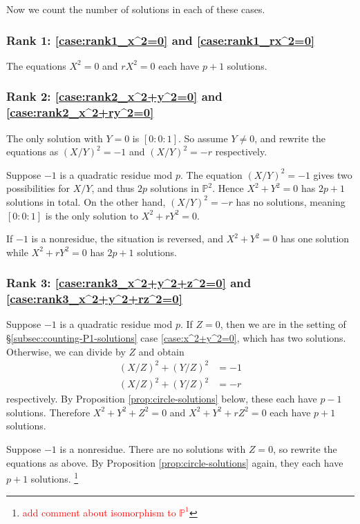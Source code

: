 \documentclass[10pt,a4paper]{amsart}
\numberwithin{equation}{section}
\numberwithin{figure}{section}
\theoremstyle{definition}
\theoremstyle{remark}
\theoremstyle{plain}
\theoremstyle{plain}
\theoremstyle{definition}
\theoremstyle{plain}
\theoremstyle{plain}
\renewcommand{\P}{\mathbb{P}}
\begin{document}
	Now we count the number of solutions in each of these cases.
	
	\subsubsection*{Rank 1: \eqref{case:rank1_x^2=0} and \eqref{case:rank1_rx^2=0}} 
	The equations $X^2 = 0$ and $rX^2 = 0$ each have $p + 1$ solutions.
	
	\subsubsection*{Rank 2: \eqref{case:rank2_x^2+y^2=0} and \eqref{case:rank2_x^2+ry^2=0}} 
	The only solution with $Y=0$ is $[0:0:1]$. So assume $Y \neq 0$, and rewrite the 
	equations as $(X/Y)^2 = -1$ and $(X/Y)^2 = -r$ respectively.
	
	Suppose $-1$ is a quadratic residue mod $p$. The equation $(X/Y)^2 = -1$ gives
	two possibilities for $X/Y$, and thus $2p$ solutions in $\mathbb{P}^2$. Hence
	$X^2 + Y^2 = 0$ has $2p + 1$ solutions in total. On the other hand, $(X/Y)^2 =
	-r$ has no solutions, meaning $[0:0:1]$ is the only solution to $X^2 + rY^2 =
	0$.
	
	If $-1$ is a nonresidue, the situation is reversed, and $X^2 + Y^2 = 0$ has one
	solution while $X^2 + rY^2 = 0$ has $2p + 1$ solutions.
	
	\subsubsection*{Rank 3: \eqref{case:rank3_x^2+y^2+z^2=0} and \eqref{case:rank3_x^2+y^2+rz^2=0}} 
	Suppose $-1$ is a quadratic residue mod $p$. If $Z = 0$, then we are in the setting of
	\S\ref{subsec:counting-P1-solutions} case \eqref{case:x^2+y^2=0}, which has two
	solutions. Otherwise, we can divide by $Z$ and obtain 
	\begin{align*} 
	(X/Z)^2 + (Y/Z)^2 &= -1 \\ 
	(X/Z)^2 + (Y/Z)^2 &= -r 
	\end{align*} 
	respectively. By Proposition \ref{prop:circle-solutions} below, these each have $p - 1$
	solutions. Therefore $X^2 + Y^2 + Z^2 = 0$ and $X^2 + Y^2 + rZ^2 = 0$ each have
	$p+1$ solutions.
	
	Suppose $-1$ is a nonresidue. There are no solutions with $Z=0$, so rewrite the
	equations as above. By Proposition \ref{prop:circle-solutions} again, they each
	have $p + 1$ solutions. \footnote{\textcolor{red}{add comment about isomorphism
			to $\P^1$}}
	
\end{document}
